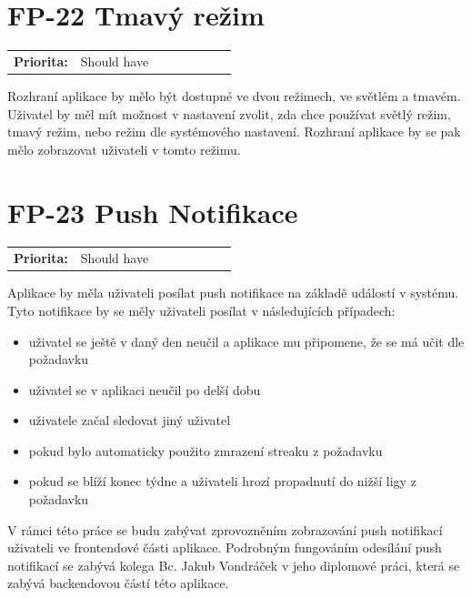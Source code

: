 \section{FP-22 Tmavý režim}\label{sec:fp-dark-mode}

\begin{tabular}{lp{0.7\linewidth}}
    \textbf{Priorita:} & Should have \\
\end{tabular}

Rozhraní aplikace by mělo být dostupné ve dvou režimech, ve světlém a tmavém. Uživatel by měl mít možnost v nastavení zvolit, zda chce používat světlý režim, tmavý režim, nebo režim dle systémového nastavení. Rozhraní aplikace by se pak mělo zobrazovat uživateli v tomto režimu.

\section{FP-23 Push Notifikace}\label{sec:fp-push-notifications}

\begin{tabular}{lp{0.7\linewidth}}
    \textbf{Priorita:} & Should have \\
\end{tabular}

Aplikace by měla uživateli posílat push notifikace na základě událostí v systému. Tyto notifikace by se měly uživateli posílat v následujících případech:

\begin{itemize}
    \item uživatel se ještě v daný den neučil a aplikace mu připomene, že se má učit dle požadavku 
    \item uživatel se v aplikaci neučil po delší dobu
    \item uživatele začal sledovat jiný uživatel
    \item pokud bylo automaticky použito zmrazení streaku z požadavku 
    \item pokud se blíží konec týdne a uživateli hrozí propadnutí do nižší ligy z požadavku 
\end{itemize}

V rámci této práce se budu zabývat zprovozněním zobrazování push notifikací uživateli ve frontendové části aplikace. Podrobným fungováním odesílání push notifikací se zabývá kolega Bc. Jakub Vondráček v jeho diplomové práci, která se zabývá backendovou částí této aplikace.

